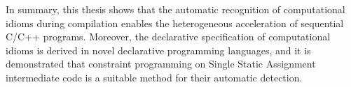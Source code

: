     In summary, this thesis shows that the automatic recognition of
    computational idioms during compilation enables the heterogeneous
    acceleration of sequential C/C++ programs.
    Moreover, the declarative specification of computational idioms is derived
    in novel declarative programming languages, and it is demonstrated that
    constraint programming on Single Static Assignment intermediate
    code is a suitable method for their automatic detection.
